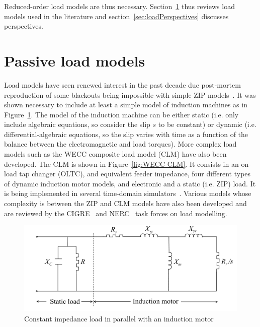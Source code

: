 
Reduced-order load models are thus necessary. Section~\ref{sec:dynLoadModel} thus reviews load models used in the literature%
and section~\ref{sec:loadPerspectives} discusses perspectives.

\section{Passive load models}
\label{sec:dynLoadModel}

Load models have seen renewed interest in the past decade due post-mortem reproduction of some blackouts being impossible with simple ZIP models~\cite[p11-12]{CIGREloadModels}. It was shown necessary to include at least a simple model of induction machines as in Figure~\ref{fig:motorLoad}. The model of the induction machine can be either static (i.e. only include algebraic equations, so consider the slip \(s\) to be constant) or dynamic (i.e. differential-algebraic equations, so the slip varies with time as a function of the balance between the electromagnetic and load torques). More complex load models such as the WECC composite load model (CLM) have also been developed. The CLM is shown in Figure~\ref{fig:WECC-CLM}. It consists in an on-load tap changer (OLTC), and equivalent feeder impedance, four different types of dynamic induction motor models, and electronic and a static (i.e. ZIP) load. It is being implemented in several time-domain simulators~\cite{NERCloadModelTF}. Various models whose complexity is between the ZIP and CLM models have also been developed and are reviewed by the CIGRE~\cite{CIGREloadModels} and NERC~\cite{NERCloadModelTF} task forces on load modelling.

\begin{figure}[t]
    \centering
    \includegraphics[width=0.6\linewidth]{Figs/MotorLoad.png}
    \caption{Constant impedance load in parallel with an induction motor~\cite{CIGREloadModels}}
    \label{fig:motorLoad}
\end{figure}

